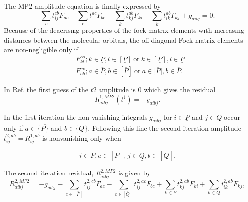 \documentclass[12pt,a4paper,english]{article}
\begin{document}
The MP2 amplitude equation is finally expressed by
\begin{equation}
  \sum_c t^{cb}_{ij}F_{ac}+\sum_ct^{ac}F_{bc}-\sum_kt^{ab}_{kj}F_{ki}-\sum_k t^{ab}_{ik}F_{kj}+g_{aibj}=0.
  \label{eq:ampleqexp}
\end{equation}
Because of the deacrising properties of the fock matrix elements with increasing distances between the molecular orbitals, the off-diagonal Fock matrix elements are non-negligible only if
\begin{equation}
  \begin{split}
	&F^{oo}_{kl}; k\in \underline{P},l\in [\underline{P}]~\mbox{or}~k\in[\underline{P}],l\in \underline{P}\\
	&F^{vv}_{ab};a\in\overline{P},b\in[\overline{P}]~\mbox{or}~a\in]\overline{P}],b\in\overline{P}.
  \end{split}
  \label{eq:t2amplrestricmp2}
\end{equation}

In Ref. \cite{Kristensen2011} the first guess of the $t2$ amplitude is 0 which
gives the residual
\begin{equation}
  R^{1,MP2}_{aibj}(t^1)=-g_{aibj}.
  \label{eq:MP2inital}
\end{equation}

In the first iteration the non-vanishing integrals $g_{aibj}$ for
$i\in\underline{P}$ and $j\in\underline{Q}$ occur only if
$a\in\{\overline{P\}}$ and $b\in\{\overline{Q}\}$. Following this line the
second iteration amplitude $t^{2,ab}_{ij}=R^{1,ab}_{ij}$ is nonvanishing only
when

\begin{equation}
  i\in\underline{P},a\in[\overline{P}],~j\in\underline{Q},b\in[\overline{Q}].
  \label{eq:2restt2mp2}
\end{equation}

The second iteration residual, $R^{2,MP2}_{aibj}$ is given by
\begin{equation}
  R^{2,MP2}_{aibj}=-g_{aibj}-\sum_{c\in[\overline{P}]}t^{2,cb}_{ij}F_{ac}-\sum_{c\in[\overline{Q}]}t^{2,ac}_{ij}F_{bc}+\sum_{k\in\underline{P}}t^{2,ab}_{kj}F_{ki}+\sum_{k\in\underline{Q}}t^{2,ab}_{ik}F_{kj},
  \label{eq:2itmp2res}
\end{equation}
\end{document}
